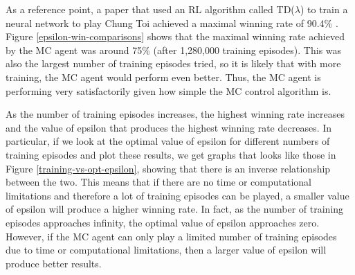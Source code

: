 \documentclass[11pt,a4paper,twoside,openright]{report}
\begin{document}
As a reference point, a paper that used an RL algorithm called TD($\lambda$) to train a neural network to play Chung Toi achieved a maximal winning rate of 90.4\% \cite{chung-toi-params}. Figure \ref{epsilon-win-comparisons} shows that the maximal winning rate achieved by the MC agent was around 75\% (after 1,280,000 training episodes). This was also the largest number of training episodes tried, so it is likely that with more training, the MC agent would perform even better. Thus, the MC agent is performing very satisfactorily given how simple the MC control algorithm is.

As the number of training episodes increases, the highest winning rate increases and the value of epsilon that produces the highest winning rate decreases. In particular, if we look at the optimal value of epsilon for different numbers of training episodes and plot these results, we get graphs that looks like those in Figure \ref{training-vs-opt-epsilon}, showing that there is an inverse relationship between the two. This means that if there are no time or computational limitations and therefore a lot of training episodes can be played, a smaller value of epsilon will produce a higher winning rate. In fact, as the number of training episodes approaches infinity, the optimal value of epsilon approaches zero. However, if the MC agent can only play a limited number of training episodes due to time or computational limitations, then a larger value of epsilon will produce better results.
\end{document}
